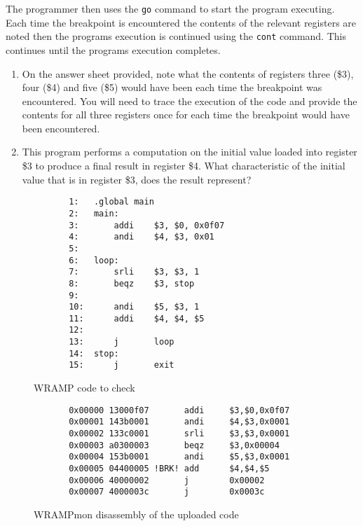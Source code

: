 \documentclass[a4paper,10pt]{article}
\begin{document}
\begin{enumerate}
The programmer then uses the \texttt{go} command to start the program
executing. Each time the breakpoint is encountered the contents of the
relevant registers are noted then the programs execution is continued
using the \texttt{cont} command. This continues until the programs
execution completes.

\begin{enumerate}
\item On the answer sheet provided, note what the contents of registers three
(\$3), four (\$4) and five (\$5) would have been each time the
breakpoint was encountered. You will need to trace the execution of
the code and provide the contents for all three registers once for
each time the breakpoint would have been encountered.

\item This program performs a computation on the initial value loaded into register \$3 to produce a final result in register \$4. What characteristic of the initial value that is in register \$3, does the result represent?
\end{enumerate}


\begin{figure}[h]
{\small
\begin{verbatim}
       1:   .global main
       2:   main:
       3:       addi    $3, $0, 0x0f07
       4:       andi    $4, $3, 0x01
       5:
       6:   loop:
       7:       srli    $3, $3, 1
       8:       beqz    $3, stop
       9:  
       10:      andi    $5, $3, 1
       11:      addi    $4, $4, $5
       12:   
       13:      j       loop
       14:  stop:
       15:      j       exit
\end{verbatim}
} 
\caption{WRAMP code to check}
\label{fig:bitcount}
\end{figure}

\begin{figure}[h]
{\small
\begin{verbatim}
       0x00000 13000f07       addi     $3,$0,0x0f07
       0x00001 143b0001       andi     $4,$3,0x0001
       0x00002 133c0001       srli     $3,$3,0x0001
       0x00003 a0300003       beqz     $3,0x00004
       0x00004 153b0001       andi     $5,$3,0x0001
       0x00005 04400005 !BRK! add      $4,$4,$5
       0x00006 40000002       j        0x00002
       0x00007 4000003c       j        0x0003c
\end{verbatim}
} 
\caption{WRAMPmon disassembly of the uploaded code}
\label{fig:bitcount-dis}
\end{figure}


\end{enumerate}
\end{document}
